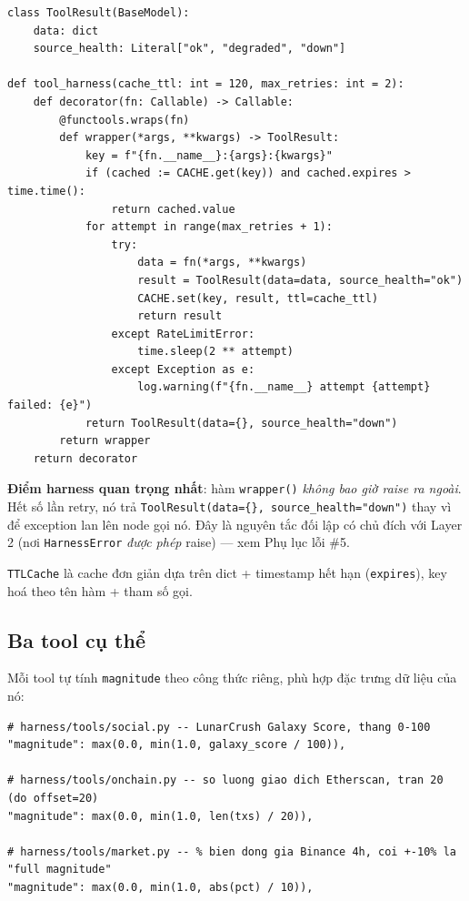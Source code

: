 \documentclass[12pt,a4paper]{article}
\begin{document}
\begin{lstlisting}
class ToolResult(BaseModel):
    data: dict
    source_health: Literal["ok", "degraded", "down"]

def tool_harness(cache_ttl: int = 120, max_retries: int = 2):
    def decorator(fn: Callable) -> Callable:
        @functools.wraps(fn)
        def wrapper(*args, **kwargs) -> ToolResult:
            key = f"{fn.__name__}:{args}:{kwargs}"
            if (cached := CACHE.get(key)) and cached.expires > time.time():
                return cached.value
            for attempt in range(max_retries + 1):
                try:
                    data = fn(*args, **kwargs)
                    result = ToolResult(data=data, source_health="ok")
                    CACHE.set(key, result, ttl=cache_ttl)
                    return result
                except RateLimitError:
                    time.sleep(2 ** attempt)
                except Exception as e:
                    log.warning(f"{fn.__name__} attempt {attempt} failed: {e}")
            return ToolResult(data={}, source_health="down")
        return wrapper
    return decorator
\end{lstlisting}

\textbf{Điểm harness quan trọng nhất}: hàm \texttt{wrapper()} \emph{không bao giờ raise ra
ngoài}. Hết số lần retry, nó trả \texttt{ToolResult(data=\{\}, source\_health="down")} thay vì để
exception lan lên node gọi nó. Đây là nguyên tắc đối lập có chủ đích với Layer 2 (nơi
\texttt{HarnessError} \emph{được phép} raise) --- xem Phụ lục lỗi \#5.

\texttt{TTLCache} là cache đơn giản dựa trên dict + timestamp hết hạn (\texttt{expires}), key hoá
theo tên hàm + tham số gọi.

\subsection*{Ba tool cụ thể}

Mỗi tool tự tính \texttt{magnitude} theo công thức riêng, phù hợp đặc trưng dữ liệu của nó:

\begin{lstlisting}
# harness/tools/social.py -- LunarCrush Galaxy Score, thang 0-100
"magnitude": max(0.0, min(1.0, galaxy_score / 100)),

# harness/tools/onchain.py -- so luong giao dich Etherscan, tran 20 (do offset=20)
"magnitude": max(0.0, min(1.0, len(txs) / 20)),

# harness/tools/market.py -- % bien dong gia Binance 4h, coi +-10% la "full magnitude"
"magnitude": max(0.0, min(1.0, abs(pct) / 10)),
\end{lstlisting}
\end{document}
